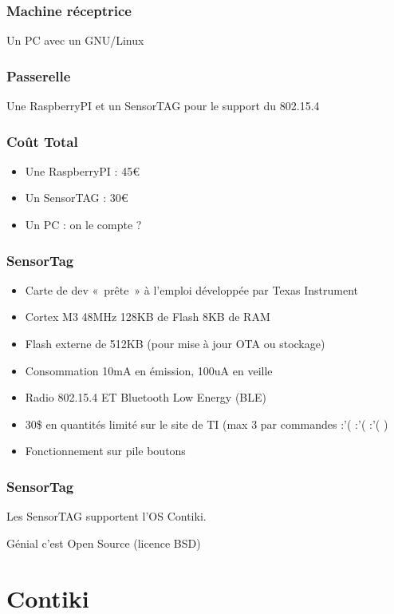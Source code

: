 \documentclass{smilebeamer}
\begin{document}
\begin{frame}
\frametitle{Machine réceptrice}

Un PC avec un GNU/Linux

\end{frame}

\begin{frame}
\frametitle{Passerelle}

Une RaspberryPI et un SensorTAG pour le support du 802.15.4

\end{frame}

\begin{frame}
\frametitle{Coût Total}
\begin{itemize}
\item Une RaspberryPI : 45€
\item Un SensorTAG : 30€
\item Un PC : on le compte ?
\end{itemize}
\end{frame}

\begin{frame}
\frametitle{SensorTag}
\begin{itemize}
\item Carte de dev « prête » à l’emploi développée par Texas Instrument
\item Cortex M3 48MHz 128KB de Flash 8KB de RAM
\item Flash externe de 512KB (pour mise à jour OTA ou stockage)
\item Consommation 10mA en émission, 100uA en veille
\item Radio 802.15.4 ET Bluetooth Low Energy (BLE)
\item 30\$ en quantités limité sur le site de TI (max 3 par commandes :'( :'( :'( )
\item Fonctionnement sur pile boutons
\end{itemize}
\end{frame}

\begin{frame}
\frametitle{SensorTag}

Les SensorTAG supportent l'OS Contiki.

Génial c'est Open Source (licence BSD)

\end{frame}




\section{Contiki}
\end{document}
